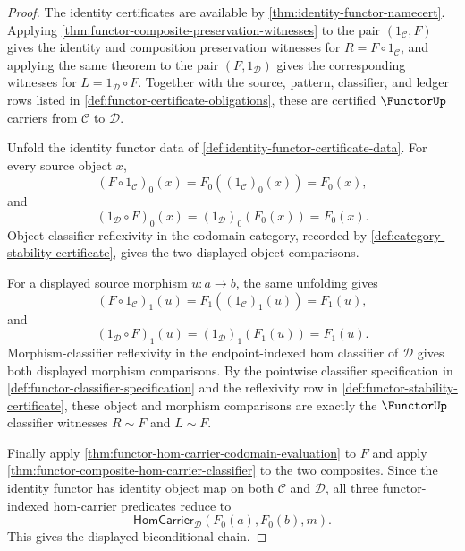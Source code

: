 \begin{proof}
The identity certificates are available by
\autoref{thm:identity-functor-namecert}. Applying
\autoref{thm:functor-composite-preservation-witnesses} to the pair
$(1_{\mathcal C},F)$ gives the identity and composition preservation witnesses
for $R=F\circ 1_{\mathcal C}$, and applying the same theorem to the pair
$(F,1_{\mathcal D})$ gives the corresponding witnesses for
$L=1_{\mathcal D}\circ F$. Together with the source, pattern, classifier, and
ledger rows listed in \autoref{def:functor-certificate-obligations}, these are
certified $\FunctorUp$ carriers from $\mathcal C$ to $\mathcal D$.

Unfold the identity functor data of
\autoref{def:identity-functor-certificate-data}. For every source object $x$,
$$
(F\circ 1_{\mathcal C})_0(x)=F_0((1_{\mathcal C})_0(x))=F_0(x),
$$
and
$$
(1_{\mathcal D}\circ F)_0(x)=(1_{\mathcal D})_0(F_0(x))=F_0(x).
$$
Object-classifier reflexivity in the codomain category, recorded by
\autoref{def:category-stability-certificate}, gives the two displayed object
comparisons.

For a displayed source morphism $u:a\to b$, the same unfolding gives
$$
(F\circ 1_{\mathcal C})_1(u)=F_1((1_{\mathcal C})_1(u))=F_1(u),
$$
and
$$
(1_{\mathcal D}\circ F)_1(u)=(1_{\mathcal D})_1(F_1(u))=F_1(u).
$$
Morphism-classifier reflexivity in the endpoint-indexed hom classifier of
$\mathcal D$ gives both displayed morphism comparisons. By the pointwise
classifier specification in \autoref{def:functor-classifier-specification} and
the reflexivity row in \autoref{def:functor-stability-certificate}, these
object and morphism comparisons are exactly the $\FunctorUp$ classifier
witnesses $R\sim F$ and $L\sim F$.

Finally apply \autoref{thm:functor-hom-carrier-codomain-evaluation} to $F$ and
apply \autoref{thm:functor-composite-hom-carrier-classifier} to the two
composites. Since the identity functor has identity object map on both
$\mathcal C$ and $\mathcal D$, all three functor-indexed hom-carrier
predicates reduce to
$$
\mathsf{HomCarrier}_{\mathcal D}(F_0(a),F_0(b),m).
$$
This gives the displayed biconditional chain.
\end{proof}

